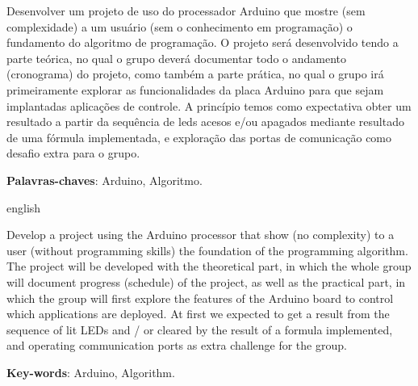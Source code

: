 \begin{resumo}

	Desenvolver um projeto de uso do processador  Arduino que mostre (sem complexidade) a um usuário (sem o conhecimento em programação) o fundamento do algoritmo de programação. O projeto será desenvolvido tendo a parte teórica, no qual o grupo deverá documentar todo o andamento (cronograma) do projeto, como também a parte prática, no qual o grupo irá primeiramente explorar as funcionalidades da placa Arduino para que sejam implantadas aplicações de controle. A princípio temos como expectativa obter um resultado a partir da sequência de leds acesos e/ou apagados mediante resultado de uma fórmula implementada, e exploração das portas de comunicação como desafio extra para o grupo.

 \vspace{\onelineskip}
    
 \noindent
 \textbf{Palavras-chaves}: Arduino, Algoritmo.
\end{resumo}

\begin{resumo}[Abstract]
 \begin{otherlanguage*}{english}
   
	Develop a project using the Arduino processor that show (no complexity) to a user (without programming skills) the foundation of the programming algorithm. The project will be developed with the theoretical part, in which the whole group will document progress (schedule) of the project, as well as the practical part, in which the group will first explore the features of the Arduino board to control which applications are deployed. At first we expected to get a result from the sequence of lit LEDs and / or cleared by the result of a formula implemented, and operating communication ports as extra challenge for the group.

   \vspace{\onelineskip}
 
   \noindent 
   \textbf{Key-words}: Arduino, Algorithm.
 \end{otherlanguage*}
\end{resumo}
